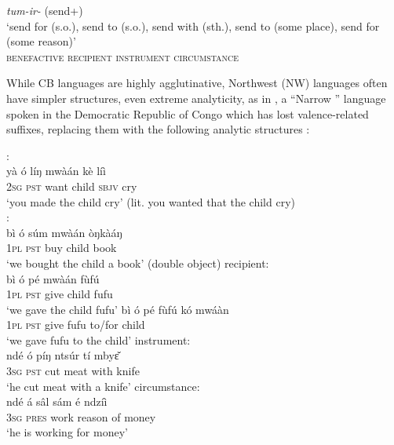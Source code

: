 \documentclass[output=paper]{langsci/langscibook}
\begin{document}
\ea \let\eachwordone=\rmfamily\upshape
\label{ex:hyman:3}
\textit{tum-ir-}  (send+) \\
\gll ‘{send for (s.o.),} {send to (s.o.),} {send with (sth.),} {send to (some place),} {send for (some reason)}’\\
\textsc{benefactive} \textsc{recipient } \textsc{ instrument} \textsc{   } \textsc{ circumstance}\\
\z
 
  While CB languages are highly agglutinative, Northwest (NW) \linebreak languages often have simpler structures, even extreme analyticity, as in , a “Narrow ” language spoken in the Democratic Republic of Congo which has lost valence-related suffixes, replacing them with the following analytic structures \citep{CraneEtAl2011}:

  
\ea
\label{ex:hyman:4}
\ea 
{}:  \\
\gll yà  ó    líŋ mwàán kè  líì  \\
\textsc{2sg} \textsc{pst} want child \textsc{sbjv} cry \\
\glt ‘you made the child cry’ (lit. you wanted that the child cry)\\
\newpage 
\ex 
{}:  \\
\gll bì   ó   súm mwàán òŋkàáŋ \\
\textsc{1pl} \textsc{pst}  buy   child     book  \\
\glt ‘we bought the child a book’  (double object)
\ex 
recipient:  \\
\gll bì   ó    pé   mwàán fùfú \\
\textsc{1pl} \textsc{pst}  give   child    fufu  \\
\glt ‘we gave the child fufu’
\ex 
\gll bì   ó    pé  fùfú  kó mwáàn \\
\textsc{1pl} \textsc{pst} give fufu to/for  child \\
\glt ‘we gave fufu to the child’
\ex 
instrument:  \\
\gll ndé ó  píŋ ntsúr  tí  mby\v{ɛ} \\
	\textsc{3sg} \textsc{pst} cut  meat with knife\\
\glt ‘he cut meat with a knife’
\ex 
circumstance:   \\
\gll ndé  á    sâl     sám {\downstep}é ndzíì\\
\textsc{3sg} \textsc{pres} work reason of money\\
\glt ‘he is working for money’
\z
\z
\end{document}
